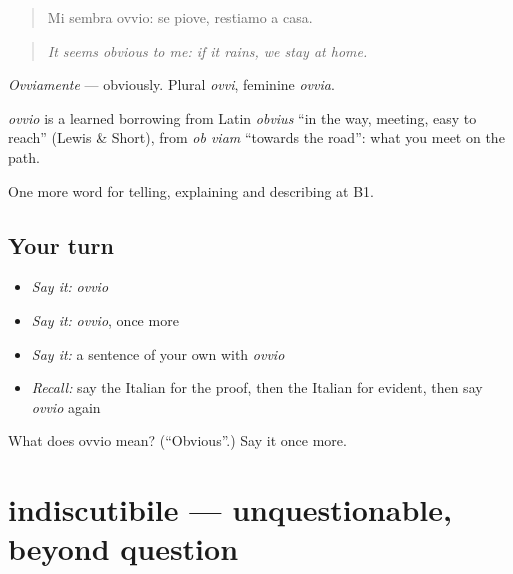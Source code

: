 \begin{quote}
Mi sembra ovvio: se piove, restiamo a casa.
\end{quote}

\begin{quote}
\emph{It seems obvious to me: if it rains, we stay at home.}
\end{quote}

\emph{Ovviamente} — obviously. Plural \emph{ovvi}, feminine \emph{ovvia}.

\begin{cousinweb}
\emph{ovvio} is a learned borrowing from Latin \emph{obvius} \textquotedblleft{}in the way, meeting, easy to reach\textquotedblright{} (Lewis \& Short), from \emph{ob viam} \textquotedblleft{}towards the road\textquotedblright{}: what you meet on the path.
\end{cousinweb}

\begin{grammarlens}[title={What you've built}]
One more word for telling, explaining and describing at B1.
\end{grammarlens}

\subsection*{Your turn}
\begin{itemize}
\raggedright
  \item \emph{Say it:} \emph{ovvio}
  \item \emph{Say it:} \emph{ovvio}, once more
  \item \emph{Say it:} a sentence of your own with \emph{ovvio}
  \item \emph{Recall:} say the Italian for the proof, then the Italian for evident, then say \emph{ovvio} again
\end{itemize}

\begin{tcolorbox}[breakable,colback=teal!4,colframe=teal!35!black,title={Before you move on}]
What does ovvio mean? (\textquotedblleft{}Obvious\textquotedblright{}.) Say it once more.
\end{tcolorbox}
\section[indiscutibile]{indiscutibile — unquestionable, beyond question}

\label{lesson:IT-C344-indiscutibile}




